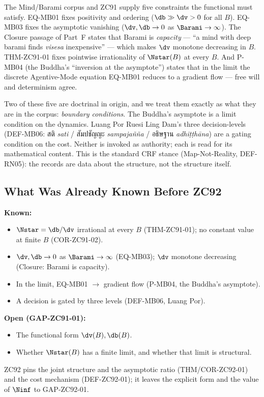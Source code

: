 \documentclass[12pt, a4paper]{article}
\begin{document}
The Mind/Barami corpus and ZC91 supply five constraints the functional
must satisfy. EQ-MB01 fixes positivity and ordering ($\db\gg\dv>0$ for all
$B$). EQ-MB03 fixes the asymptotic vanishing ($\dv,\db\to0$ as
$\Barami\to\infty$). The Closure passage of Part~F states that Barami is
\emph{capacity} --- ``a mind with deep barami finds \emph{visesa}
inexpensive'' --- which makes $\dv$ monotone decreasing in $B$. THM-ZC91-01
fixes pointwise irrationality of $\Nstar(B)$ at every $B$. And P-MB04 (the
Buddha's ``inversion at the asymptote'') states that in the limit the
discrete Agentive-Mode equation EQ-MB01 reduces to a gradient flow ---
free will and determinism agree.

Two of these five are doctrinal in origin, and we treat them exactly as
what they are in the corpus: \emph{boundary conditions}. The Buddha's
asymptote is a limit condition on the dynamics. Luang Por Ruesi Ling Dam's
three decision-levels (DEF-MB06: {\thaifont สติ} \emph{sati} / {\thaifont สัมปชัญญะ}
\emph{sampajañña} / {\thaifont อธิษฐาน} \emph{adhiṭṭhāna}) are a gating
condition on the cost. Neither is invoked as authority; each is read for
its mathematical content. This is the standard CRF stance (Map-Not-Reality,
DEF-RN05): the records are data about the structure, not the structure
itself.

\subsection{What Was Already Known Before ZC92}

\begin{keybox}[title={Pre-ZC92 Status}]
\textbf{Known:}
\begin{itemize}[leftmargin=2em, noitemsep]
  \item $\Nstar=\db/\dv$ irrational at every $B$ (THM-ZC91-01); no
    constant value at finite $B$ (COR-ZC91-02).
  \item $\dv,\db\to0$ as $\Barami\to\infty$ (EQ-MB03); $\dv$ monotone
    decreasing (Closure: Barami is capacity).
  \item In the limit, EQ-MB01 $\to$ gradient flow (P-MB04, the Buddha's
    asymptote).
  \item A decision is gated by three levels (DEF-MB06, Luang Por).
\end{itemize}

\textbf{Open (GAP-ZC91-01):}
\begin{itemize}[leftmargin=2em, noitemsep]
  \item The functional form $\dv(B),\db(B)$.
  \item Whether $\Nstar(B)$ has a finite limit, and whether that limit is
    structural.
\end{itemize}

ZC92 pins the joint structure and the asymptotic ratio (THM/COR-ZC92-01)
and the cost mechanism (DEF-ZC92-01); it leaves the explicit form and the
value of $\Ninf$ to GAP-ZC92-01.
\end{keybox}
\end{document}
